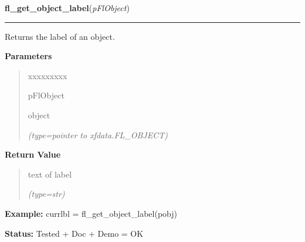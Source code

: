 \hspace{.8\funcindent}\begin{boxedminipage}{\funcwidth}

    \raggedright \textbf{fl\_get\_object\_label}(\textit{pFlObject})

    \vspace{-1.5ex}

    \rule{\textwidth}{0.5\fboxrule}
\setlength{\parskip}{2ex}
    Returns the label of an object.

\setlength{\parskip}{1ex}
      \textbf{Parameters}
      \vspace{-1ex}

      \begin{quote}
        \begin{Ventry}{xxxxxxxxx}

          \item[pFlObject]

          object

            {\it (type=pointer to xfdata.FL\_OBJECT)}

        \end{Ventry}

      \end{quote}

      \textbf{Return Value}
    \vspace{-1ex}

      \begin{quote}
      text of label

      {\it (type=str)}

      \end{quote}

\textbf{Example:} currlbl = fl\_get\_object\_label(pobj)



\textbf{Status:} Tested + Doc + Demo = OK



    \end{boxedminipage}

    \label{xformslib:flbasic:fl_set_object_helper}

    \vspace{0.5ex}

